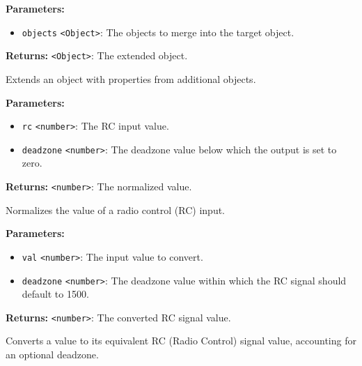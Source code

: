 \documentclass[12pt,a4paper]{article}
\begin{document}
\noindent \textbf{Parameters:}
\begin{itemize}
  \item \texttt{objects} \texttt{<Object>}: The objects to merge into the target object.
\end{itemize}

\noindent \textbf{Returns:} \texttt{<Object>}: The extended object.

\noindent Extends an object with properties from additional objects.

\vspace{5mm}
\noindent {}


\noindent \textbf{Parameters:}
\begin{itemize}
  \item \texttt{rc} \texttt{<number>}: The RC input value.
  \item \texttt{deadzone} \texttt{<number>}: The deadzone value below which the output is set to zero.
\end{itemize}

\noindent \textbf{Returns:} \texttt{<number>}: The normalized value.

\noindent Normalizes the value of a radio control (RC) input.

\vspace{5mm}
\noindent {}


\noindent \textbf{Parameters:}
\begin{itemize}
  \item \texttt{val} \texttt{<number>}: The input value to convert.
  \item \texttt{deadzone} \texttt{<number>}: The deadzone value within which the RC signal should default to 1500.
\end{itemize}

\noindent \textbf{Returns:} \texttt{<number>}: The converted RC signal value.

\noindent Converts a value to its equivalent RC (Radio Control) signal value, accounting for an optional deadzone.

\vspace{5mm}
\noindent {}
\end{document}
